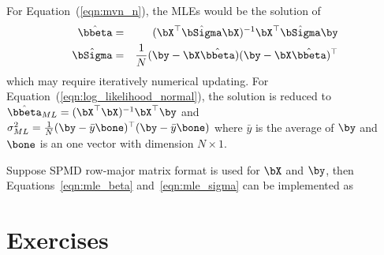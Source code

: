 For Equation~(\ref{eqn:mvn_n}), the MLEs would be the solution of
\begin{eqnarray}
\hat{\bbeta} & = & (\bX^\top \hat{\bSigma} \bX)^{-1}
                   \bX^\top \hat{\bSigma} \by
                   \label{eqn:mle_beta} \\
\hat{\bSigma} & = & \frac{1}{N} (\by - \bX\hat{\bbeta})
                                (\by - \bX\hat{\bbeta})^\top
                   \label{eqn:mle_sigma}
\end{eqnarray}
which may require iteratively numerical updating.
For Equation~(\ref{eqn:log_likelihood_normal}),
the solution is reduced to
$\hat{\bbeta}_{ML} = (\bX^\top \bX)^{-1} \bX^\top \by$ and
$\sigma^2_{ML} = \frac{1}{N} (\by - \bar{y}\bone)^\top(\by - \bar{y}\bone)$
where $\bar{y}$ is the average of $\by$
and $\bone$ is an one vector with dimension $N\times 1$.


Suppose SPMD row-major matrix format is used for $\bX$ and $\by$, then
Equations~\ref{eqn:mle_beta} and~\ref{eqn:mle_sigma} can be implemented
as
\begin{Code}
\end{Code}












\section{Exercises}
\label{sec:mle_exercise}

